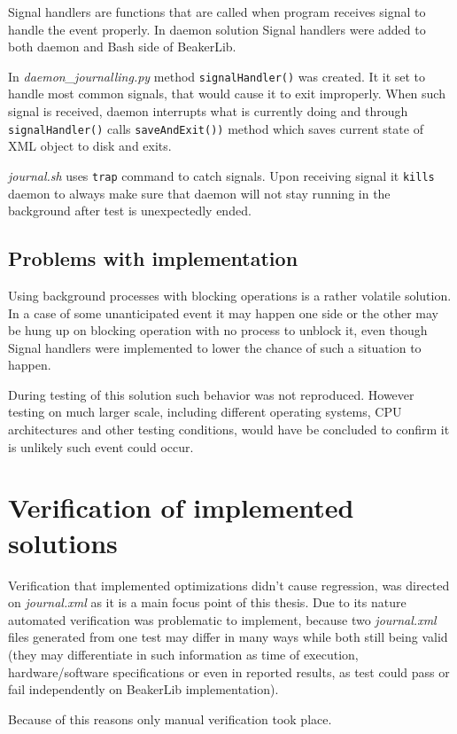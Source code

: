 Signal handlers are functions that are called when program receives signal to handle the event properly. In daemon solution Signal handlers were added to both daemon and Bash side of BeakerLib.

In \textit{daemon\_journalling.py} method \texttt{signalHandler()} was created. It it set to handle most common signals, that would cause it to exit improperly. When such signal is received, daemon interrupts what is currently doing and through \texttt{signalHandler()} calls \texttt{saveAndExit())} method which saves current state of XML object to disk and exits.

\textit{journal.sh} uses \texttt{trap} command to catch signals. Upon receiving signal it \texttt{kills} daemon to always make sure that daemon will not stay running in the background after test is unexpectedly ended.  

\subsection{Problems with implementation}
Using background processes with blocking operations is a rather volatile solution. In a case of some unanticipated event it may happen one side or the other may be hung up on blocking operation with no process to unblock it, even though Signal handlers were implemented to lower the chance of such a situation to happen.

During testing of this solution such behavior was not reproduced. However testing on much larger scale, including different operating systems, CPU architectures and other testing conditions, would have be concluded to confirm it is unlikely such event could occur. 


\section{Verification of implemented solutions}
Verification that implemented optimizations didn't cause regression, was directed on \textit{journal.xml} as it is a main focus point of this thesis. Due to its nature automated verification was problematic to implement, because two \textit{journal.xml} files generated from one test may differ in many ways while both still being valid (they may differentiate in such information as time of execution, hardware/software specifications or even in reported results, as test could pass or fail independently on BeakerLib implementation).

Because of this reasons only manual verification took place.

